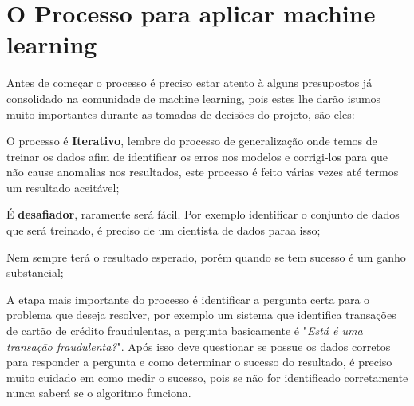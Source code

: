\section{O Processo para aplicar machine learning}
\label{sec:howtoapplyml}

Antes de começar o processo é preciso estar atento à alguns presupostos já consolidado na comunidade de machine learning, pois estes lhe darão isumos muito importantes durante 
as tomadas de decisões do projeto, são eles: 
\begin{alineas}
    \item O processo é \textbf{Iterativo}, lembre do processo de generalização onde temos de treinar os dados afim de identificar os erros nos modelos e corrigi-los para que não cause
    anomalias nos resultados, este processo é feito várias vezes até termos um resultado aceitável;
    \item É  \textbf{desafiador}, raramente será fácil. Por exemplo identificar o conjunto de dados que será treinado, é preciso de um cientista de dados paraa isso; 
    \item Nem sempre terá o resultado esperado, porém quando se tem sucesso é um ganho substancial;
\end{alineas}
  
A etapa mais importante do processo é identificar a pergunta certa para o problema que deseja resolver, por exemplo um sistema que identifica transações de cartão de crédito fraudulentas, a 
pergunta basicamente é "\textit{Está é uma transação fraudulenta?}". Após isso deve questionar se possue os dados corretos para responder a pergunta e como determinar o sucesso do resultado,
é preciso muito cuidado em como medir o sucesso, pois se não for identificado corretamente nunca saberá se o algoritmo funciona. 